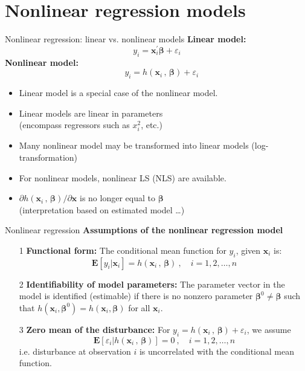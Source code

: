\documentclass{beamer}
\begin{document}
\section{Nonlinear regression models}
\begin{frame}{Nonlinear regression: linear vs. nonlinear models}
\textbf{Linear model:}
$$
y_i = \bm{x}_i^{\prime}\bm{\beta} + \varepsilon_i
$$
\textbf{Nonlinear model:}
$$
~~~~~y_i = h(\bm{x}_i\, , \,\bm{\beta}) + \varepsilon_i
$$
\begin{itemize}
    \item Linear model is a special case of the nonlinear model.
    \item Linear models are linear in parameters \\(encompass regressors such as $x_i^2$, etc.)
    \item Many nonlinear model may be transformed into linear models (log-transformation)
    \item For nonlinear models, nonlinear LS (NLS) are available.
    \item $\partial h(\bm{x}_i\, , \,\bm{\beta})/\partial \bm{x}$ is no longer equal to $\bm\beta$ \\
    (interpretation based on estimated model \dots)
\end{itemize}
\end{frame}
\begin{frame}{Nonlinear regression}
\textbf{Assumptions of the nonlinear regression model}\\
\begin{itemize}
 \item[1] \textbf{Functional form:} The conditional mean function for $y_i$, given $\bm{x}_i$ is: $$\mathbf{E}[y_i|\bm{x}_i] = h(\bm{x}_i\, , \,\bm{\beta})~, \quad i=1,2,\dots,n$$
 \item[2] \textbf{Identifiability of model parameters:} The parameter vector in the model is identified (estimable) if there is no nonzero parameter $\bm{\beta}^0 \neq \bm{\beta}$ such that $h(\bm{x}_i, \bm{\beta}^0)=h(\bm{x}_i, \bm{\beta})$ for all $\bm{x}_i$.
 \medskip
 \item[3] \textbf{Zero mean of the disturbance:} For $y_i = h(\bm{x}_i\, , \,\bm{\beta}) + \varepsilon_i$, we assume $$
 \mathbf{E}[\varepsilon_i| h(\bm{x}_i\, , \,\bm{\beta})] = 0~, \quad i=1,2,\dots,n
 $$
 i.e. disturbance at observation $i$ is uncorrelated with the conditional mean function.
\end{itemize}
\end{frame}
\end{document}
